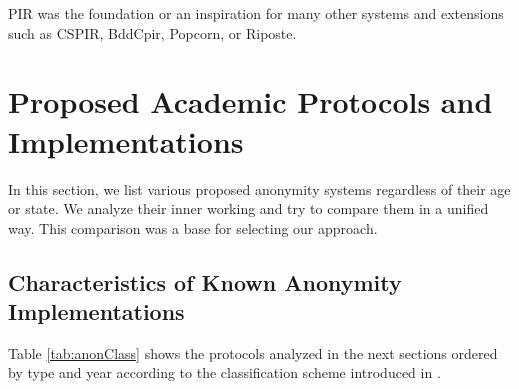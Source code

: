 PIR was the foundation or an inspiration for many other systems and extensions such as CSPIR\cite{lipmaa2009first}, BddCpir\cite{lipmaa2009first}, Popcorn\cite{gupta2016scalable}, or Riposte\cite{corrigan2015riposte}.

\chapter{Proposed Academic Protocols and Implementations}\label{sec:implSystems}
In this section, we list various proposed anonymity systems regardless of their age or state. We analyze their inner working and try to compare them in a unified way. This comparison was a base for selecting our approach.


\section{Characteristics of Known Anonymity Implementations}
Table \ref{tab:anonClass} shows the protocols analyzed in the next sections ordered by type and year according to the classification scheme introduced in \cite{Shirazi2018}.

